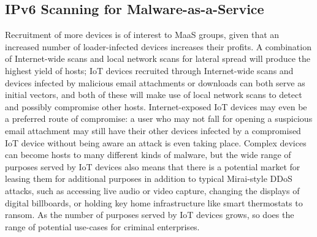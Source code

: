 \documentclass[10pt,sigconf]{acmart}
\begin{document}
\subsection{IPv6 Scanning for Malware-as-a-Service}

Recruitment of more devices is of interest to MaaS groups, given that an increased number of loader-infected devices increases their profits.
A combination of Internet-wide scans and local network scans for lateral spread will produce the highest yield of hosts;
IoT devices recruited through Internet-wide scans and devices infected by malicious email attachments or downloads can both serve as initial vectors, and both of these will make use of local network scans to detect and possibly compromise other hosts.
Internet-exposed IoT devices may even be a preferred route of compromise:
a user who may not fall for opening a suspicious email attachment may still have their other devices infected by a compromised IoT device without being aware an attack is even taking place.
Complex devices can become hosts to many different kinds of malware, but the wide range of purposes served by IoT devices also means that there is a potential market for leasing them for additional purposes in addition to typical Mirai-style DDoS attacks, such as accessing live audio or video capture, changing the displays of digital billboards, or holding key home infrastructure like smart thermostats to ransom.
As the number of purposes served by IoT devices grows, so does the range of potential use-cases for criminal enterprises.
\end{document}
